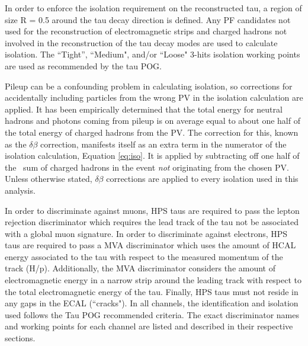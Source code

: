In order to enforce the isolation requirement on the reconstructed tau, a region of size R = 0.5 around the tau decay  direction is defined. Any PF candidates not used for the reconstruction of electromagnetic strips and charged 
hadrons not involved in the reconstruction of the tau decay modes are used to calculate isolation. The ``Tight'', ``Medium", and/or ``Loose" 3-hits isolation working points are used as recommended by the tau POG. 

Pileup can be a confounding problem in calculating isolation, so corrections for accidentally including particles from the wrong PV in the isolation calculation are applied. It has been empirically determined that the total energy for neutral hadrons and photons coming from pileup is on average equal to about one half of the total energy of charged hadrons from the PV. The correction for this, known as the $\delta\beta$ correction, manifests itself as an extra term in the numerator of the isolation calculation, Equation \ref{eq:iso}. It is applied by subtracting off one half of the \pt ~sum of charged hadrons in the event \textit{not} originating from the chosen PV. Unless otherwise stated, $\delta\beta$ corrections are applied to every isolation used in this analysis.

In order to discriminate against muons, HPS taus are required to pass the lepton rejection 
discriminator which requires the lead track of the tau not be associated with a global muon signature. In order to 
discriminate against electrons, HPS taus are required to pass a MVA discriminator which uses the amount of HCAL energy 
associated to the tau with respect to the measured momentum of the track (H/p). Additionally, the MVA discriminator 
considers the amount of electromagnetic energy in a narrow strip around the leading track with respect to the total 
electromagnetic energy of the tau. Finally, HPS taus must not reside in any gaps in the ECAL (``cracks"). 
In all channels, the identification and isolation used follows the Tau POG recommended criteria.
The exact discriminator names and working points for each channel are listed and described in their respective sections.




